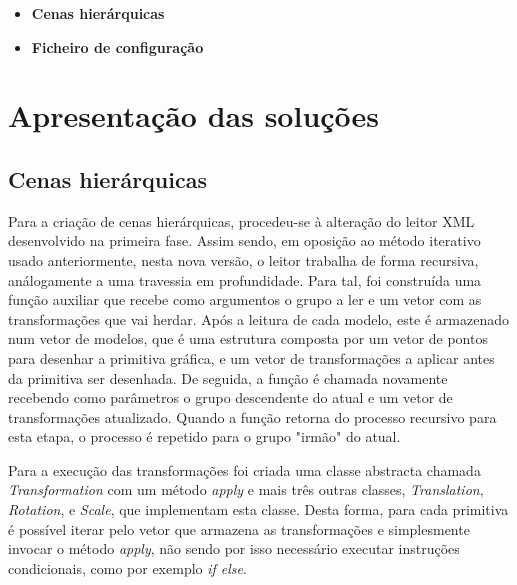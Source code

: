 \documentclass[11pt,a4paper]{report}
\begin{document}
\begin{itemize}
    \item \textbf{Cenas hierárquicas}

    \item \textbf{Ficheiro de configuração}
\end{itemize}


\chapter{Apresentação das soluções}
\section{Cenas hierárquicas}
Para a criação de cenas hierárquicas, procedeu-se à alteração do leitor XML desenvolvido na primeira fase. Assim sendo, em oposição ao método iterativo usado anteriormente, nesta nova versão, o leitor trabalha de forma recursiva, análogamente a uma travessia em profundidade. Para tal, foi construída uma função auxiliar que recebe como argumentos o grupo a ler e um vetor com as transformações que vai herdar. Após a leitura de cada modelo, este é armazenado num vetor de modelos, que é uma estrutura composta por um vetor de pontos para desenhar a primitiva gráfica, e um vetor de transformações a aplicar antes da primitiva ser desenhada. De seguida, a função é chamada novamente recebendo como parâmetros o grupo descendente do atual e um vetor de transformações atualizado. Quando a função retorna do processo recursivo para esta etapa, o processo é repetido para o grupo "irmão" do atual. \par
Para a execução das transformações foi criada uma classe abstracta chamada \textit{Transformation} com um método \textit{apply} e mais três outras classes, \textit{Translation}, \textit{Rotation},  e \textit{Scale}, que implementam esta classe. Desta forma, para cada primitiva é possível iterar pelo vetor que armazena as transformações e simplesmente invocar o método \textit{apply}, não sendo por isso necessário executar instruções condicionais, como por exemplo \textit{if else}.  
\end{document}
